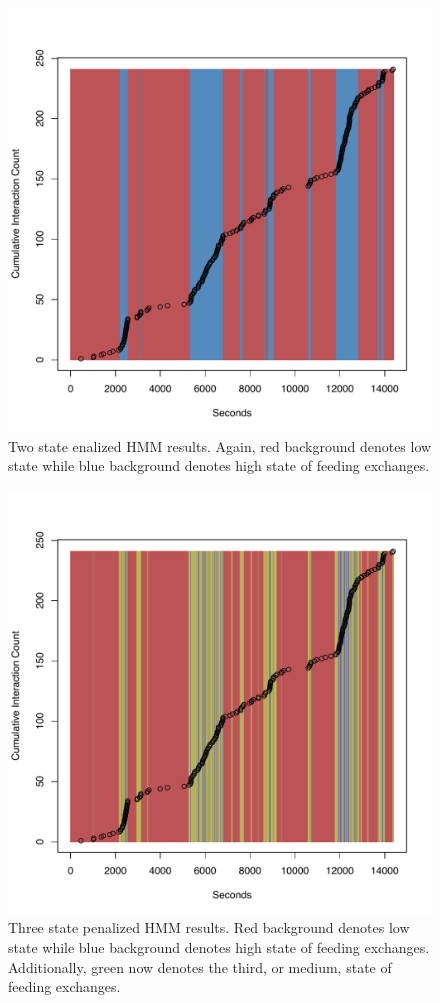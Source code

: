 \documentclass[cmbright,fleqn,referee]{envauth}
\begin{document}
% 
\begin{figure}
 \centerline{\includegraphics[width=6in]{Pen2_MSPE-6_states.pdf}}
 \caption{Two state enalized HMM results. Again, red background denotes low state while blue background denotes high state of feeding exchanges.}
\label{f:penaltystates}
\end{figure}
% 
\begin{figure}
 \centerline{\includegraphics[width=6in]{Pen3_-3_states.pdf}}
\caption{Three state penalized HMM results. Red background denotes low state while blue background denotes high state of feeding exchanges. Additionally, green now denotes the third, or medium, state of feeding exchanges.}
\label{f:pen3states}
\end{figure}
\end{document}
